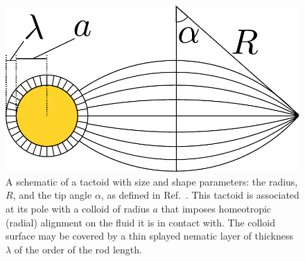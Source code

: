 \documentclass[%
 aip,
 amsmath,amssymb,
 reprint,%
]{revtex4-1}
\begin{document}
\begin{figure}[t]
\centering
\includegraphics[scale=0.6]{media/190812-fig5-v4.pdf}
\caption{A schematic of a tactoid with size and shape parameters: the radius, $R$, and the tip angle $\alpha$, as defined in Ref.~. This tactoid is associated at its pole with a colloid of radius $a$ that imposes homeotropic (radial) alignment on the fluid it is in contact with. The colloid surface may be covered by a thin splayed nematic layer of thickness $\lambda$ of the order of the rod length.}
\label{fig:tactoidTheorySchematic}
\end{figure}
\end{document}
